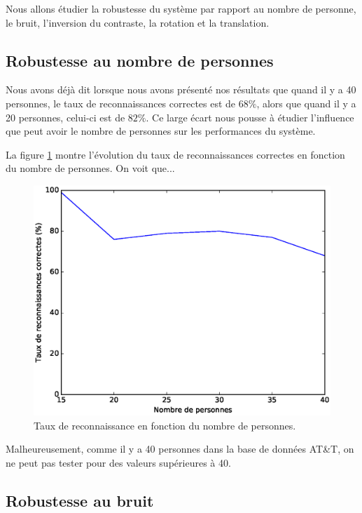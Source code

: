 Nous allons étudier la robustesse du système par rapport au nombre de personne,
le bruit, l'inversion du contraste, la rotation et la translation.


\subsection{Robustesse au nombre de personnes}
Nous avons déjà dit lorsque nous avons présenté nos résultats que quand il y a
40 personnes, le taux de reconnaissances correctes est de $68\%$, alors que quand
il y a 20 personnes, celui-ci est de $82\%$. Ce large écart nous pousse à étudier
l'influence que peut avoir le nombre de personnes sur les performances du système.

La figure \ref{fig:robustness:nombre_de_personnes} montre l'évolution du taux
de reconnaissances correctes en fonction du nombre de personnes. On voit que...

\begin{figure}[H]
    \centering
    \includegraphics[scale=0.5]{images/robustesse_nombre_de_personnes}
    \caption{Taux de reconnaissance en fonction du nombre de personnes.}
    \label{fig:robustness:nombre_de_personnes}
\end{figure}
Malheureusement, comme il y a 40 personnes dans la base de données AT\&T, on ne 
peut pas tester pour des valeurs supérieures à 40.


\subsection{Robustesse au bruit}
